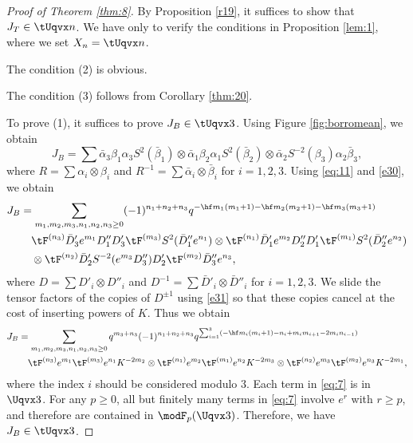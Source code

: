 \documentclass{amsart}
\numberwithin{equation}{section}
\numberwithin{figure}{section}
\theoremstyle{plain}
\theoremstyle{definition}
\theoremstyle{remark}
\begin{document}
\begin{proof}[Proof of Theorem \ref{thm:8}]
  By Proposition \ref{r19}, it suffices to show that $J_T\in \tUqvx n$.
  We have only to verify the conditions in Proposition \ref{lem:1},
  where we set $X_n=\tUqvx n$.

  The condition (2) is obvious.

  The condition (3) follows from Corollary \ref{thm:20}.

  To prove (1), it suffices to prove $J_B\in \tUqvx3$.  Using Figure
  \ref{fig:borromean}, we obtain
  \begin{equation*}
    J_B
    = \sum
    \bar\alpha _3 \beta _1         \alpha _3 S^2(\bar\beta _1)\otimes 
    \bar\alpha _1 \beta _2         \alpha _1 S^2(\bar\beta _2)\otimes 
    \bar\alpha _2 S^{-2}(\beta _3) \alpha _2 \bar\beta _3,
  \end{equation*}
  where $R=\sum \alpha _i\otimes \beta _i$ and $R^{-1}=\sum \bar\alpha _i\otimes \bar\beta _i$ for
  $i=1,2,3$.  Using \eqref{eq:11} and \eqref{e30}, we obtain
    \begin{equation*}
    \begin{split}
      J_B
      &=
      \sum_{m_1,m_2,m_3,n_1,n_2,n_3\ge 0}
      (-1)^{n_1+n_2+n_3}
      q^{-\hf m_1(m_1+1)-\hf m_2(m_2+1)-\hf m_3(m_3+1)}\\&\quad
      \tF^{(n_3)}\bar D'_3 e^{m_1}D''_1        D'_3\tF^{(m_3)} S^2(\bar D''_1e^{n_1})\otimes 
      \tF^{(n_1)}\bar D'_1 e^{m_2}D''_2         D'_1\tF^{(m_1)} S^2(\bar
      D''_2e^{n_2})\\
      &\quad \otimes \tF^{(n_2)}\bar D'_2 S^{-2}(e^{m_3}D''_3) D'_2\tF^{(m_2)} \bar D''_3e^{n_3},
    \end{split}
  \end{equation*}
    where $D=\sum D'_i\otimes D''_i$ and $D^{-1}=\sum \bar D'_i\otimes \bar D''_i$
    for $i=1,2,3$.  We slide the tensor factors of the copies of
    $D^{\pm 1}$ using \eqref{e31} so that these copies cancel at the cost
    of inserting powers of $K$.  Thus we obtain
    \begin{equation}
      \label{eq:7}
      \begin{split}
	J_B
	&=
	\sum_{m_1,m_2,m_3,n_1,n_2,n_3\ge 0}q^{m_3+n_3}
	(-1)^{n_1+n_2+n_3}
	q^{\sum_{i=1}^3( -\hf m_i(m_i+1)-n_i+m_im_{i+1}-2m_in_{i-1})}\\
	&\quad \tF^{(n_3)} e^{m_1}   \tF^{(m_3)} e^{n_1}K^{-2m_2}\otimes 
	\tF^{(n_1)} e^{m_2}    \tF^{(m_1)} e^{n_2}K^{-2m_3}\otimes 
	\tF^{(n_2)} e^{m_3}    \tF^{(m_2)} e^{n_3}K^{-2m_1},
      \end{split}
    \end{equation}
    where the index $i$ should be considered modulo $3$.  Each term in
    \eqref{eq:7} is in $\Uqvx3$.  For any $p\ge 0$, all but finitely
    many terms in \eqref{eq:7} involve $e^r$ with $r\ge p$, and therefore
    are contained in $\modF _p(\Uqvx3)$.  Therefore, we have
    $J_B\in \tUqvx3$.
\end{proof}
\end{document}
